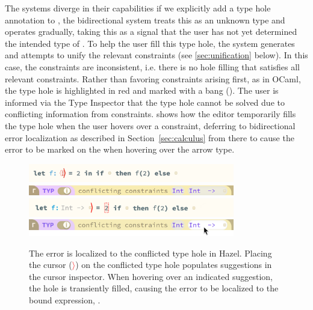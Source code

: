 The systems diverge in their capabilities if we explicitly add a type hole annotation to , the bidirectional system treats this as an unknown type and operates gradually, taking this as a signal that the user has not yet determined the intended type of . To help the user fill this type hole, the system generates and attempts to unify the relevant constraints (see \cref{sec:unification} below). In this case, the constraints are inconsistent, i.e. there is no hole filling that satisfies all relevant constraints. Rather than favoring constraints arising first, as in OCaml, the type hole is highlighted in red and marked with a bang (\li{!}). The user is informed via the Type Inspector that the type hole cannot be solved due to conflicting information from constraints.  shows how the editor temporarily fills the type hole when the user hovers over a constraint, deferring to bidirectional error localization as described in Section~\ref{sec:calculus} from there to cause the error to be marked on the  when hovering over the arrow type.
\begin{figure}[H]
\includegraphics[width=9cm]{images/example_conflict.png}
\includegraphics[width=9cm]{images/example-conflict-newnew.png}
\includegraphics[width=9cm]{images/example_conflict_hover.png}
\includegraphics[width=9cm]{images/example-conflict-hover-final.png}
\caption{The error is localized to the conflicted type hole in Hazel. Placing the cursor (\textcolor{red}{$\rangle$}) on the conflicted type hole populates suggestions in the cursor inspector. When hovering over an indicated suggestion, the hole is transiently filled, causing the error to be localized to the bound expression, .}
\label{fig:editor_conflict}
\end{figure}


